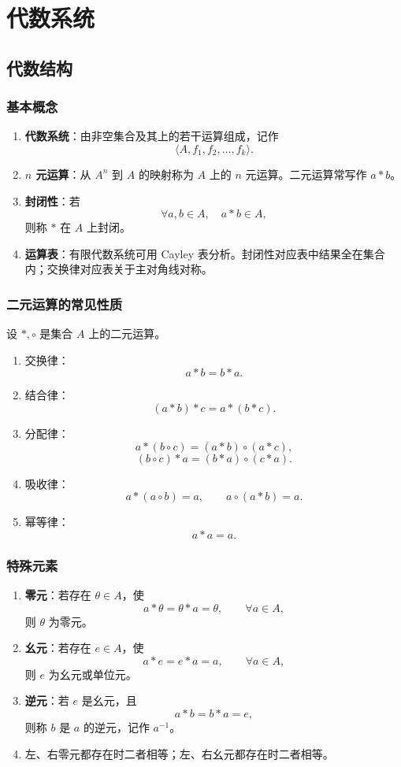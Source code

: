 \section{代数系统}

\subsection{代数结构}

\subsubsection{基本概念}

\begin{enumerate}
	\item \textbf{代数系统}：由非空集合及其上的若干运算组成，记作
	\[
	\langle A,f_1,f_2,\dots,f_k\rangle.
	\]
	\item \textbf{\(n\) 元运算}：从 \(A^n\) 到 \(A\) 的映射称为 \(A\) 上的 \(n\) 元运算。二元运算常写作 \(a*b\)。
	\item \textbf{封闭性}：若
	\[
	\forall a,b\in A,\quad a*b\in A,
	\]
	则称 \(*\) 在 \(A\) 上封闭。
	\item \textbf{运算表}：有限代数系统可用 Cayley 表分析。封闭性对应表中结果全在集合内；交换律对应表关于主对角线对称。
\end{enumerate}

\subsubsection{二元运算的常见性质}

设 \(*,\circ\) 是集合 \(A\) 上的二元运算。
\begin{enumerate}
	\item 交换律：
	\[
	a*b=b*a.
	\]
	\item 结合律：
	\[
	(a*b)*c=a*(b*c).
	\]
	\item 分配律：
	\[
	a*(b\circ c)=(a*b)\circ(a*c),
	\]
	\[
	(b\circ c)*a=(b*a)\circ(c*a).
	\]
	\item 吸收律：
	\[
	a*(a\circ b)=a,\qquad a\circ(a*b)=a.
	\]
	\item 幂等律：
	\[
	a*a=a.
	\]
\end{enumerate}

\subsubsection{特殊元素}

\begin{enumerate}
	\item \textbf{零元}：若存在 \(\theta\in A\)，使
	\[
	a*\theta=\theta*a=\theta,\qquad \forall a\in A,
	\]
	则 \(\theta\) 为零元。
	\item \textbf{幺元}：若存在 \(e\in A\)，使
	\[
	a*e=e*a=a,\qquad \forall a\in A,
	\]
	则 \(e\) 为幺元或单位元。
	\item \textbf{逆元}：若 \(e\) 是幺元，且
	\[
	a*b=b*a=e,
	\]
	则称 \(b\) 是 \(a\) 的逆元，记作 \(a^{-1}\)。
	\item 左、右零元都存在时二者相等；左、右幺元都存在时二者相等。
\end{enumerate}

